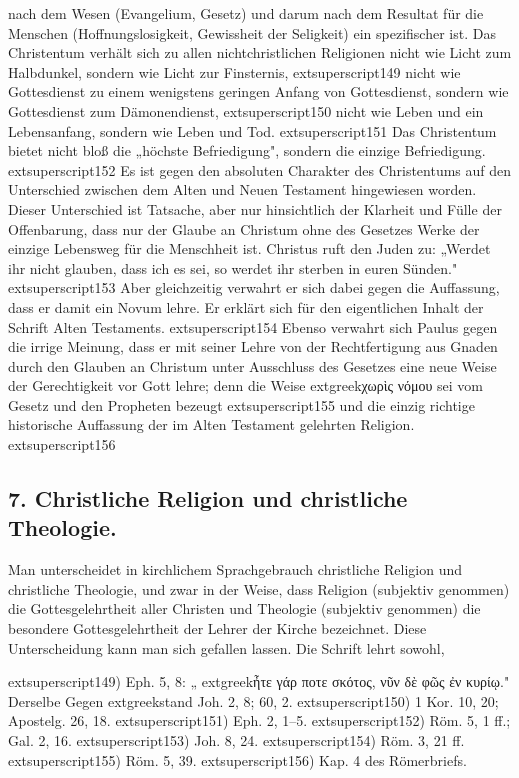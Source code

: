 nach dem Wesen (Evangelium, Gesetz) und darum nach dem Resultat für die Menschen (Hoffnungslosigkeit, Gewissheit der Seligkeit) ein spezifischer ist. Das Christentum verhält sich zu allen nichtchristlichen Religionen nicht wie Licht zum Halbdunkel, sondern wie Licht zur Finsternis,	extsuperscript{149} nicht wie Gottesdienst zu einem wenigstens geringen Anfang von Gottesdienst, sondern wie Gottesdienst zum Dämonendienst,	extsuperscript{150} nicht wie Leben und ein Lebensanfang, sondern wie Leben und Tod.	extsuperscript{151} Das Christentum bietet nicht bloß die „höchste Befriedigung", sondern die einzige Befriedigung.	extsuperscript{152}
Es ist gegen den absoluten Charakter des Christentums auf den Unterschied zwischen dem Alten und Neuen Testament hingewiesen worden. Dieser Unterschied ist Tatsache, aber nur hinsichtlich der Klarheit und Fülle der Offenbarung, dass nur der Glaube an Christum ohne des Gesetzes Werke der einzige Lebensweg für die Menschheit ist. Christus ruft den Juden zu: „Werdet ihr nicht glauben, dass ich es sei, so werdet ihr sterben in euren Sünden."	extsuperscript{153} Aber gleichzeitig verwahrt er sich dabei gegen die Auffassung, dass er damit ein Novum lehre. Er erklärt sich für den eigentlichen Inhalt der Schrift Alten Testaments.	extsuperscript{154} Ebenso verwahrt sich Paulus gegen die irrige Meinung, dass er mit seiner Lehre von der Rechtfertigung aus Gnaden durch den Glauben an Christum unter Ausschluss des Gesetzes eine neue Weise der Gerechtigkeit vor Gott lehre; denn die Weise 	extgreek{χωρὶς νόμου} sei vom Gesetz und den Propheten bezeugt	extsuperscript{155} und die einzig richtige historische Auffassung der im Alten Testament gelehrten Religion.	extsuperscript{156}

\subsection*{7. Christliche Religion und christliche Theologie.}
Man unterscheidet in kirchlichem Sprachgebrauch christliche Religion und christliche Theologie, und zwar in der Weise, dass Religion (subjektiv genommen) die Gottesgelehrtheit aller Christen und Theologie (subjektiv genommen) die besondere Gottesgelehrtheit der Lehrer der Kirche bezeichnet. Diese Unterscheidung kann man sich gefallen lassen. Die Schrift lehrt sowohl,

\vspace{1em}
\noindent
	extsuperscript{149)} Eph. 5, 8: „	extgreek{ἦτε γάρ ποτε σκότος, νῦν δὲ φῶς ἐν κυρίῳ}." Derselbe Gegen	extgreek{stand} Joh. 2, 8; 60, 2.
\noindent
	extsuperscript{150)} 1 Kor. 10, 20; Apostelg. 26, 18.
\noindent
	extsuperscript{151)} Eph. 2, 1–5.
\noindent
	extsuperscript{152)} Röm. 5, 1 ff.; Gal. 2, 16.
\noindent
	extsuperscript{153)} Joh. 8, 24.
\noindent
	extsuperscript{154)} Röm. 3, 21 ff.
\noindent
	extsuperscript{155)} Röm. 5, 39.
\noindent
	extsuperscript{156)} Kap. 4 des Römerbriefs.